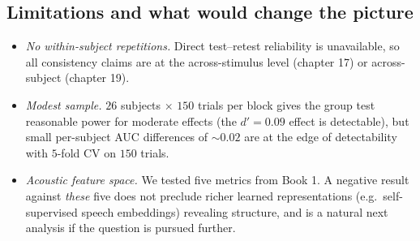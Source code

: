 \documentclass[11pt]{article}
\begin{document}
\subsection*{Limitations and what would change the picture}

\begin{itemize}
\item \emph{No within-subject repetitions.} Direct test--retest reliability
      is unavailable, so all consistency claims are at the across-stimulus
      level (chapter 17) or across-subject (chapter 19).
\item \emph{Modest sample.} $26$ subjects $\times$ $150$ trials per block
      gives the group test reasonable power for moderate effects (the
      $d'=0.09$ effect is detectable), but small per-subject AUC differences
      of $\sim 0.02$ are at the edge of detectability with $5$-fold CV on
      $150$ trials.
\item \emph{Acoustic feature space.} We tested five metrics from Book 1.
      A negative result against \emph{these} five does not preclude richer
      learned representations (e.g.\ self-supervised speech embeddings)
      revealing structure, and is a natural next analysis if the question
      is pursued further.
\end{itemize}
\end{document}
